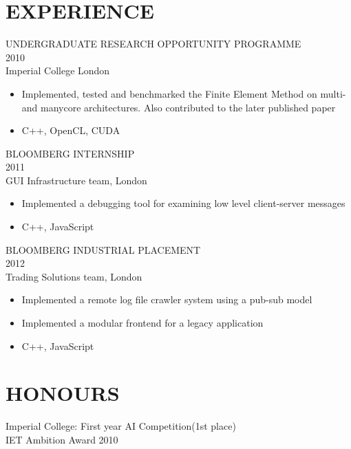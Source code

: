 \documentclass[11pt]{res} %
\begin{document}
\begin{resume}
\section{EXPERIENCE} 
UNDERGRADUATE RESEARCH OPPORTUNITY PROGRAMME\\
2010\\
Imperial College London
\vspace{0.2in}
   \begin{itemize} \itemsep -2pt  %
   \item Implemented, tested and benchmarked the Finite Element Method on multi- and manycore architectures. Also contributed to the later published paper\cite{markall0}
   \item C++, OpenCL, CUDA
 \end{itemize}

BLOOMBERG INTERNSHIP\\
2011\\
GUI Infrastructure team, London
\vspace{0.2in}
 \begin{itemize} \itemsep -2pt
   \item Implemented a debugging tool for examining low level client-server messages
   \item C++, JavaScript
\end{itemize} 

BLOOMBERG INDUSTRIAL PLACEMENT\\
2012\\
Trading Solutions team, London
\vspace{0.2in}
 \begin{itemize} \itemsep -2pt
   \item Implemented a remote log file crawler system using a pub-sub model
   \item Implemented a modular frontend for a legacy application
   \item C++, JavaScript
\end{itemize} 

\section{HONOURS} 
 
Imperial College: First year AI Competition(1st place)\\
IET Ambition Award 2010


\end{resume}
\end{document}
